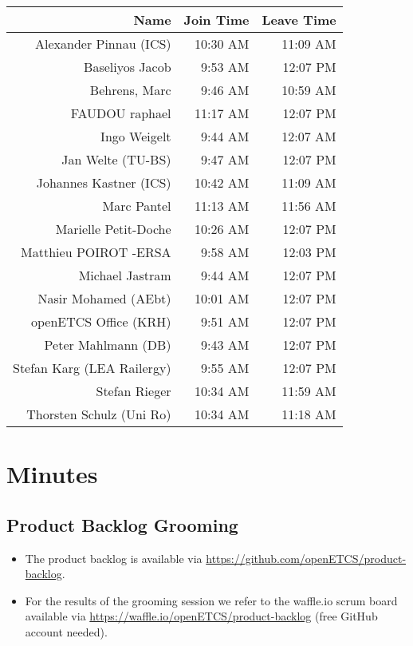 \documentclass[a4paper, 11pt]{article}
\begin{document}
\begin{table}[htbp]
    \begin{tabular}{rrr}
    \toprule
    \textbf{Name} & \textbf{Join Time} & \textbf{Leave Time} \\
    \midrule
    Alexander Pinnau (ICS) & 10:30 AM & 11:09 AM \\
    Baseliyos Jacob & 9:53 AM & 12:07 PM \\
    Behrens, Marc & 9:46 AM & 10:59 AM \\
    FAUDOU raphael & 11:17 AM & 12:07 PM \\
    Ingo Weigelt & 9:44 AM & 12:07 AM \\
    Jan Welte (TU-BS) & 9:47 AM & 12:07 PM \\
    Johannes Kastner (ICS) & 10:42 AM & 11:09 AM \\
    Marc Pantel & 11:13 AM & 11:56 AM \\
    Marielle Petit-Doche & 10:26 AM & 12:07 PM \\
    Matthieu POIROT -ERSA & 9:58 AM & 12:03 PM \\
    Michael Jastram & 9:44 AM & 12:07 PM \\
    Nasir Mohamed (AEbt) & 10:01 AM & 12:07 PM \\
    openETCS  Office (KRH) & 9:51 AM & 12:07 PM \\
    Peter Mahlmann (DB) & 9:43 AM & 12:07 PM \\
    Stefan Karg (LEA Railergy) & 9:55 AM & 12:07 PM \\
    Stefan Rieger & 10:34 AM & 11:59 AM \\
    Thorsten Schulz (Uni Ro) & 10:34 AM & 11:18 AM \\
    \bottomrule
    \end{tabular}%
\end{table}%



\section{Minutes}

\subsection{Product Backlog Grooming}
\begin{itemize}
\item The product backlog is available via 
\url{https://github.com/openETCS/product-backlog}. 
\item For the results of the grooming session we refer to the waffle.io scrum board available via \url{https://waffle.io/openETCS/product-backlog} (free GitHub account needed).
\end{itemize}
\end{document}
